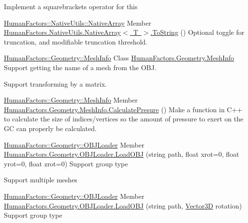 
\begin{DoxyRefList}
\item[Class \mbox{\hyperlink{class_human_factors_1_1_native_utils_1_1_native_array}{Human\+Factors.Native\+Utils.Native\+Array$<$ T $>$}} ]\label{todo__todo000001}%
%
Implement a squarebrackets operator for this 
\end{DoxyRefList}

\mbox{\hyperlink{class_human_factors_1_1_native_utils_1_1_native_array}{Human\+Factors\+::\+Native\+Utils\+::\+Native\+Array}} Member \mbox{\hyperlink{class_human_factors_1_1_native_utils_1_1_native_array_a02ec6be681dc2006c5eb725ce59a9999}{Human\+Factors.Native\+Utils.Native\+Array$<$ T $>$.To\+String}} () \label{todo__todo000002}%
%
 Optional toggle for truncation, and modifiable truncation threshold. 

\mbox{\hyperlink{class_human_factors_1_1_geometry_1_1_mesh_info}{Human\+Factors\+::\+Geometry\+::\+Mesh\+Info}} Class \mbox{\hyperlink{class_human_factors_1_1_geometry_1_1_mesh_info}{Human\+Factors.Geometry.Mesh\+Info}}  \label{todo__todo000003}%
%
Support getting the name of a mesh from the O\+BJ. 

Support transforming by a matrix. 

\mbox{\hyperlink{class_human_factors_1_1_geometry_1_1_mesh_info}{Human\+Factors\+::\+Geometry\+::\+Mesh\+Info}} Member \mbox{\hyperlink{class_human_factors_1_1_geometry_1_1_mesh_info_ab5359e337ca952f01134eeef7a4c0cb9}{Human\+Factors.Geometry.Mesh\+Info.Calculate\+Presure}} () \label{todo__todo000004}%
%
 Make a function in C++ to calculate the size of indices/vertices so the amount of pressure to exert on the GC can properly be calculated.  

\mbox{\hyperlink{class_human_factors_1_1_geometry_1_1_o_b_j_loader}{Human\+Factors\+::\+Geometry\+::\+O\+B\+J\+Loader}} Member \mbox{\hyperlink{class_human_factors_1_1_geometry_1_1_o_b_j_loader_a098857909670796a533833086d753fb2}{Human\+Factors.Geometry.O\+B\+J\+Loader.Load\+O\+BJ}} (string path, float xrot=0, float yrot=0, float zrot=0) \label{todo__todo000005}%
%
Support group type 

Support multiple meshes 

\mbox{\hyperlink{class_human_factors_1_1_geometry_1_1_o_b_j_loader}{Human\+Factors\+::\+Geometry\+::\+O\+B\+J\+Loader}} Member \mbox{\hyperlink{class_human_factors_1_1_geometry_1_1_o_b_j_loader_a3901e6fb42296a1ace65f52aefb83ff3}{Human\+Factors.Geometry.O\+B\+J\+Loader.Load\+O\+BJ}} (string path, \mbox{\hyperlink{struct_human_factors_1_1_vector3_d}{Vector3D}} rotation) \label{todo__todo000006}%
%
Support group type 

